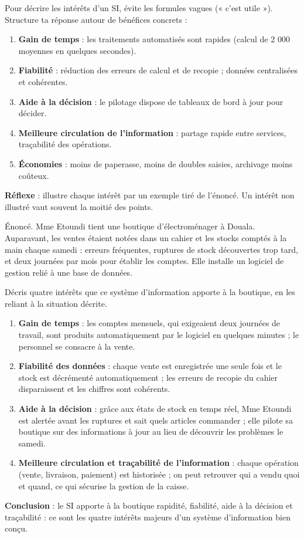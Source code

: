 \documentclass[11pt]{article}
\begin{document}
\begin{methode}
Pour décrire les intérêts d'un SI, évite les formules vagues (« c'est utile »). Structure ta réponse autour de bénéfices concrets :
\begin{enumerate}
\item \textbf{Gain de temps} : les traitements automatisés sont rapides (calcul de 2 000 moyennes en quelques secondes).
\item \textbf{Fiabilité} : réduction des erreurs de calcul et de recopie ; données centralisées et cohérentes.
\item \textbf{Aide à la décision} : le pilotage dispose de tableaux de bord à jour pour décider.
\item \textbf{Meilleure circulation de l'information} : partage rapide entre services, traçabilité des opérations.
\item \textbf{Économies} : moins de paperasse, moins de doubles saisies, archivage moins coûteux.
\end{enumerate}
\textbf{Réflexe} : illustre chaque intérêt par un exemple tiré de l'énoncé. Un intérêt non illustré vaut souvent la moitié des points.
\end{methode}

\begin{exoresolu}
Énoncé. Mme Etoundi tient une boutique d'électroménager à Douala. Auparavant, les ventes étaient notées dans un cahier et les stocks comptés à la main chaque samedi : erreurs fréquentes, ruptures de stock découvertes trop tard, et deux journées par mois pour établir les comptes. Elle installe un logiciel de gestion relié à une base de données.

Décris quatre intérêts que ce système d'information apporte à la boutique, en les reliant à la situation décrite.
\tcblower
\begin{enumerate}
\item \textbf{Gain de temps} : les comptes mensuels, qui exigeaient deux journées de travail, sont produits automatiquement par le logiciel en quelques minutes ; le personnel se consacre à la vente.
\item \textbf{Fiabilité des données} : chaque vente est enregistrée une seule fois et le stock est décrémenté automatiquement ; les erreurs de recopie du cahier disparaissent et les chiffres sont cohérents.
\item \textbf{Aide à la décision} : grâce aux états de stock en temps réel, Mme Etoundi est alertée avant les ruptures et sait quels articles commander ; elle pilote sa boutique sur des informations à jour au lieu de découvrir les problèmes le samedi.
\item \textbf{Meilleure circulation et traçabilité de l'information} : chaque opération (vente, livraison, paiement) est historisée ; on peut retrouver qui a vendu quoi et quand, ce qui sécurise la gestion de la caisse.
\end{enumerate}
\textbf{Conclusion} : le SI apporte à la boutique rapidité, fiabilité, aide à la décision et traçabilité : ce sont les quatre intérêts majeurs d'un système d'information bien conçu.
\end{exoresolu}
\end{document}
